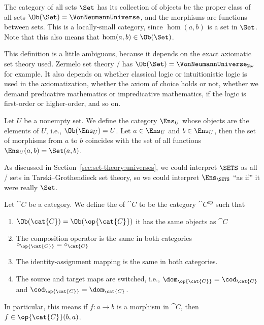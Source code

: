 \begin{example}
The category of all sets $\Set$ has its collection of objects be the
proper class of all sets $\Ob(\Set)=\VonNeumannUniverse$, and the
morphisms are functions between sets. This is a locally-small
category, since $\hom(a,b)$ is a set in $\Set$. Note that this also
means that $\hom(a,b)\in\Ob(\Set)$.

This definition is a little ambiguous, because it depends on the exact
axiomatic set theory used. Zermelo set theory \Z/ has
$\Ob(\Set)=\VonNeumannUniverse_{2\omega}$ for example. It also depends
on whether classical logic or intuitionistic logic is used in the
axiomatization, whether the axiom of choice holds or not, whether we
demand predicative mathematics or impredicative mathematics, if the
logic is first-order or higher-order, and so on.
\end{example}

\begin{example}
Let $U$ be a nonempty set. We define the category $\Ens_{U}$ whose
objects are the elements of $U$, i.e., $\Ob(\Ens_{U})=U$. Let
$a\in\Ens_{U}$ and $b\in\Ens_{U}$, then the set of morphisms from $a$
to $b$ coincides with the set of all functions $\Ens_{U}(a,b)=\Set(a,b)$.

As discussed in Section~\ref{sec:set-theory:universes}, we could
interpret $\SETS$ as all \ZF/ sets in Tarski--Grothendieck set theory,
so we could interpret $\Ens_{\SETS}$ ``as if'' it were really $\Set$.
\end{example}

\begin{example}

\end{example}

\begin{definition}
Let $\cat{C}$ be a category. We define the  of
$\cat{C}$ to be the category $\cat{C}^{\text{op}}$ such that
\begin{enumerate}
\item $\Ob(\cat{C})=\Ob(\op{\cat{C}})$ it has the same objects as $\cat{C}$
\item The composition operator is the same in both categories $\circ_{\op{\cat{C}}}=\circ_{\cat{C}}$
\item The identity-assignment mapping is the same in both categories.
\item The source and target maps are switched, i.e.,
  $\dom_{\op{\cat{C}}}=\cod_{\cat{C}}$ and $\cod_{\op{\cat{C}}}=\dom_{\cat{C}}$.
\end{enumerate}
In particular, this means if $f\colon a\to b$ is a morphism in
$\cat{C}$, then $f\in\op{\cat{C}}(b,a)$.
\end{definition}

